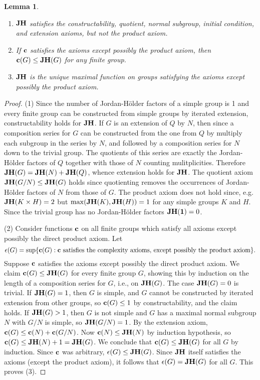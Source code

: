 \documentclass[a4paper,11pt]{amsart}
\newtheorem{lemma}[theorem]{Lemma}
\theoremstyle{definition}
\renewcommand{\c}{\mbox{\bf c}}
\newcommand{\JH}{{\bf JH}}
\newcommand{\1}{{\mathbf 1}}
\begin{document}
\begin{lemma} \label{JH}
\begin{enumerate}
\item $\JH$ satisfies the constructability, quotient, normal subgroup, initial condition, and extension axioms, but not the product axiom.     
\item If $\c$ satisfies the axioms except possibly the product axiom, then $\c(G)\leq \JH(G)$ for any finite group. \label{DomByJH} 
\item $\JH$ is the unique maximal function on groups satisfying the axioms except possibly  the product axiom. 
\end{enumerate}
\end{lemma}
\begin{proof}  (1) Since the number of Jordan-Hölder factors of a simple group is 1 and every finite group can be constructed from simple groups by iterated extension, constructability holds for $\JH$. 
If $G$ is an extension of $Q$ by $N$, then since a composition series for $G$ can be constructed from the one from $Q$ by multiply each subgroup in the series by $N$, and followed by a composition series for $N$ down to the trivial group.  The quotients of this series are exactly the Jordan-Hölder factors of $Q$ together with those of $N$ counting mulitplicities.
Therefore
$\JH(G)=\JH(N)+\JH(Q)$, whence extension holds for $\JH$. 
The quotient axiom $\JH(G/N) \leq \JH(G)$ holds since quotienting removes the occurrences of Jordan-Hölder factors of $N$ from  those of $G$. 
The product axiom does not hold since, e.g. $\JH(K \times H)=2$ but $\max(\JH(K),\JH(H))=1$ for any simple groups $K$ and $H$. Since the trivial group has no Jordan-Hölder factors $\JH(\1)=0$.


(2) Consider functions $\c$ on all finite groups which satisfy all axioms except possibly the direct product axiom. 
Let $$\epsilon(G)= \sup \{\c(G) : \c \mbox{ satisfies the complexity axioms, except possibly the product axiom}\}.$$
Suppose $\c$ satisfies the axioms except possibly the direct product axiom. 
We claim $\c(G)\leq \JH(G)$ for every finite group $G$, showing this by induction on the length of a composition series for $G$, i.e., on $\JH(G)$.  The case $\JH(G)=0$ is trivial.
If $\JH(G)=1$, then $G$ is simple, and $G$ cannot be constructed by iterated extension from other groups, so $\c(G)\leq 1$ by constructability, and the claim holds. 
If $\JH(G)>1$, then $G$ is not simple
and $G$ has a maximal normal subgroup $N$ with $G/N$ is simple, so $\JH(G/N)=1$. By the extension axiom, $\c(G) \leq \c(N) + \c(G/N)$. Now $\c(N) \leq \JH(N)$ by induction hypothesis,  so $\c(G)\leq \JH(N)+1=\JH(G)$.
We conclude that $\c(G) \leq \JH(G)$ for all $G$ by induction.  Since $\c$ was arbitrary, 
 $\epsilon(G) \leq \JH(G)$.
Since $\JH$ itself satisfies the axioms (except the product axiom), it follows that $\epsilon(G)=\JH(G)$ for all $G$. This proves (3).
\end{proof}
\end{document}
